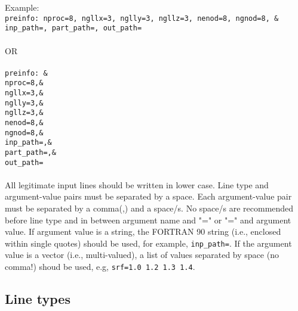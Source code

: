 Example:\\
\texttt{preinfo: nproc=8, ngllx=3, nglly=3, ngllz=3, nenod=8, ngnod=8, \& \\
inp\_path=, part\_path=, out\_path=}\\
\\
OR
\\
\\
\texttt{preinfo:   \quad\&\\
          \hspace*{18pt} nproc=8,\&\\
          \hspace*{18pt} ngllx=3,\&\\ 
          \hspace*{18pt} nglly=3,\&\\ 
          \hspace*{18pt} ngllz=3,\&\\ 
          \hspace*{18pt} nenod=8,\&\\ 
          \hspace*{18pt} ngnod=8,\&\\
          \hspace*{18pt} inp\_path=,\&\\
          \hspace*{18pt} part\_path=,\&\\ 
          \hspace*{18pt} out\_path=}\\
\\
All legitimate input lines should be written in lower case. Line type and argument-value pairs must be separated by a space. Each argument-value pair must be separated by a comma(,) and a space/s. No space/s are recommended before line type and in between argument name and "=" or "=" and argument value. If argument value is a string, the FORTRAN 90 string (i.e., enclosed within single quotes) should be used, for example, \texttt{inp\_path=}. If the argument value is a vector (i.e., multi-valued), a list of values separated by space (no comma!) shoud be used, e.g, \texttt{srf=1.0 1.2 1.3 1.4}.

\subsection{Line types}

